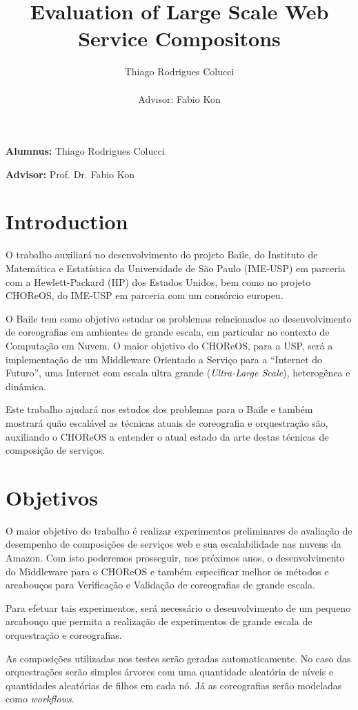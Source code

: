 \documentclass[11pt,a4paper]{article}
\title{Evaluation of Large Scale Web Service Compositons}
\author{Thiago Rodrigues Colucci\\\\Advisor: Fabio Kon}
\begin{document}
\maketitle

\newpage

\tableofcontents
\newpage
\textbf{Alumnus:} Thiago Rodrigues Colucci

\textbf{Advisor:} Prof. Dr. Fabio Kon

\section{Introduction}
O trabalho auxiliará no desenvolvimento do projeto Baile, do Instituto de Matemática e Estatística da Universidade de São Paulo (IME-USP) em parceria com a Hewlett-Packard (HP) dos Estados Unidos, bem como no projeto CHOReOS, do IME-USP em parceria com um consórcio europeu. 

O Baile tem como objetivo estudar os problemas relacionados ao desenvolvimento de coreografias em ambientes de grande escala, em particular no contexto de Computação em Nuvem. O maior objetivo do CHOReOS, para a USP, será a implementação de um Middleware Orientado a Serviço para a ``Internet do Futuro'', uma Internet com escala ultra grande (\textit{Ultra-Large Scale}), heterogênea e dinâmica. 

Este trabalho ajudará nos estudos dos problemas para o Baile e também mostrará quão escalável as técnicas atuais de coreografia e orquestração são, auxiliando o CHOReOS a entender o atual estado da arte destas técnicas de composição de serviços.

\section{Objetivos}
O maior objetivo do trabalho é realizar experimentos preliminares de avaliação de desempenho de composições de serviços web e sua escalabilidade nas nuvens da Amazon. Com isto poderemos prosseguir, nos próximos anos, o desenvolvimento do Middleware para o CHOReOS e também especificar melhor os métodos e arcabouços para Verificação e Validação de coreografias de grande escala.

Para efetuar tais experimentos, será necessário o desenvolvimento de um pequeno arcabouço que permita a realização de experimentos de grande escala de orquestração e coreografias. 

As composições utilizadas nos testes serão geradas automaticamente. No caso das orquestrações serão simples árvores com uma quantidade aleatória de níveis e quantidades aleatórias de filhos em cada nó. Já as coreografias serão modeladas como \textit{workflows}.
\end{document}

